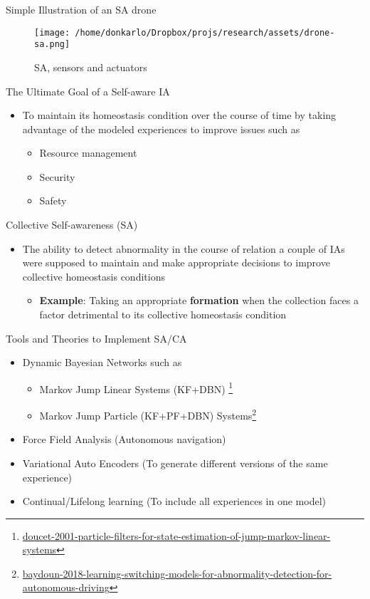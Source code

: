 \documentclass[unknownkeysallowed]{beamer}
\begin{document}
	\begin{frame}{Simple Illustration of an SA drone}
		\begin{figure}
			\texttt{[image: /home/donkarlo/Dropbox/projs/research/assets/drone-sa.png]}
			\caption{SA, sensors and actuators}
		\end{figure}
	\end{frame}

	\begin{frame}{The Ultimate Goal of a Self-aware IA}
		\begin{itemize}
			\item To maintain its homeostasis condition over the course of time by taking advantage of the modeled experiences to improve issues such as 
			\begin{itemize}
				\item Resource management
				\item Security
				\item Safety
			\end{itemize}
		\end{itemize}
	\end{frame}

	\begin{frame}{Collective Self-awareness (SA)}
		\begin{itemize}
			\item The ability to detect abnormality in the course of relation a couple of IAs were supposed to maintain and make appropriate decisions to improve collective homeostasis conditions
				\begin{itemize}
					\item \textbf{Example}: Taking an appropriate \textbf{formation} when the collection faces a factor detrimental to its collective homeostasis condition
				\end{itemize}
		\end{itemize}
	\end{frame}

	\begin{frame}{Tools and Theories to Implement SA/CA}
		\begin{itemize}
			\item Dynamic Bayesian Networks such as 
			\begin{itemize}
				\item Markov Jump Linear Systems (KF+DBN) \footnote{\url{doucet-2001-particle-filters-for-state-estimation-of-jump-markov-linear-systems}}
				\item Markov Jump Particle (KF+PF+DBN) Systems\footnote{\url{baydoun-2018-learning-switching-models-for-abnormality-detection-for-autonomous-driving}}
			\end{itemize}
			\item Force Field Analysis (Autonomous navigation)
			\item Variational Auto Encoders (To generate different versions of the same experience)
			\item Continual/Lifelong learning (To include all experiences in one model)
		\end{itemize}
	\end{frame}
\end{document}
